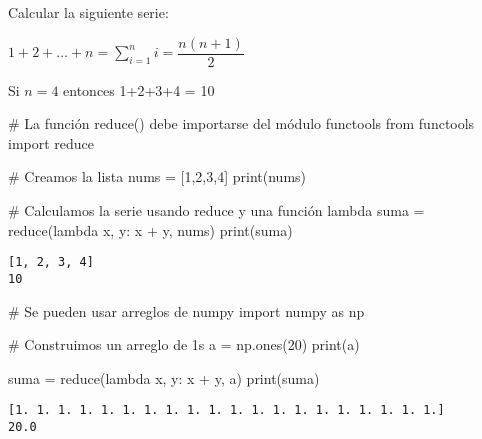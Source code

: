 \documentclass[
  letterpaper,
  DIV=11,
  numbers=noendperiod]{scrreprt}
\newenvironment{Shaded}{\begin{snugshade}}{\end{snugshade}}
\newcommand{\BuiltInTok}[1]{\textcolor[rgb]{0.00,0.23,0.31}{#1}}
\newcommand{\CommentTok}[1]{\textcolor[rgb]{0.37,0.37,0.37}{#1}}
\newcommand{\DecValTok}[1]{\textcolor[rgb]{0.68,0.00,0.00}{#1}}
\newcommand{\ImportTok}[1]{\textcolor[rgb]{0.00,0.46,0.62}{#1}}
\newcommand{\KeywordTok}[1]{\textcolor[rgb]{0.00,0.23,0.31}{#1}}
\newcommand{\NormalTok}[1]{\textcolor[rgb]{0.00,0.23,0.31}{#1}}
\newcommand{\OperatorTok}[1]{\textcolor[rgb]{0.37,0.37,0.37}{#1}}
\begin{document}
Calcular la siguiente serie:

\(1 + 2 + \dots + n = \sum\limits_{i=1}^{n} i = \dfrac{n(n+1)}{2}\)

Si \(n = 4\) entonces 1+2+3+4 = 10

\begin{Shaded}
\begin{Highlighting}[]
\CommentTok{\# La función reduce() debe importarse del módulo functools}
\ImportTok{from}\NormalTok{ functools }\ImportTok{import} \BuiltInTok{reduce} 
\end{Highlighting}
\end{Shaded}

\begin{Shaded}
\begin{Highlighting}[]
\CommentTok{\# Creamos la lista}
\NormalTok{nums }\OperatorTok{=}\NormalTok{ [}\DecValTok{1}\NormalTok{,}\DecValTok{2}\NormalTok{,}\DecValTok{3}\NormalTok{,}\DecValTok{4}\NormalTok{]}
\BuiltInTok{print}\NormalTok{(nums)}

\CommentTok{\# Calculamos la serie usando reduce y una función lambda}
\NormalTok{suma }\OperatorTok{=} \BuiltInTok{reduce}\NormalTok{(}\KeywordTok{lambda}\NormalTok{ x, y: x }\OperatorTok{+}\NormalTok{ y, nums)}
\BuiltInTok{print}\NormalTok{(suma)}
\end{Highlighting}
\end{Shaded}

\begin{verbatim}
[1, 2, 3, 4]
10
\end{verbatim}

\begin{Shaded}
\begin{Highlighting}[]
\CommentTok{\# Se pueden usar arreglos de numpy}
\ImportTok{import}\NormalTok{ numpy }\ImportTok{as}\NormalTok{ np}

\CommentTok{\# Construimos un arreglo de 1\textquotesingle{}s}
\NormalTok{a }\OperatorTok{=}\NormalTok{ np.ones(}\DecValTok{20}\NormalTok{)}
\BuiltInTok{print}\NormalTok{(a)}

\NormalTok{suma }\OperatorTok{=} \BuiltInTok{reduce}\NormalTok{(}\KeywordTok{lambda}\NormalTok{ x, y: x }\OperatorTok{+}\NormalTok{ y, a)}
\BuiltInTok{print}\NormalTok{(suma)}
\end{Highlighting}
\end{Shaded}

\begin{verbatim}
[1. 1. 1. 1. 1. 1. 1. 1. 1. 1. 1. 1. 1. 1. 1. 1. 1. 1. 1. 1.]
20.0
\end{verbatim}
\end{document}
